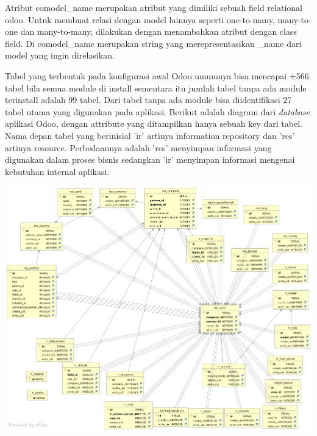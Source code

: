 Atribut comodel{\_}name merupakan atribut yang dimiliki sebuah field relational odoo. Untuk membuat relasi dengan model lainnya seperti one-to-many, many-to-one dan many-to-many, dilakukan dengan menambahkan atribut dengan class field. Di comodel{\_}name merupakan string yang merepresentasikan {\_}name dari model yang ingin direlasikan. 

Tabel yang terbentuk pada konfigurasi awal Odoo umumnya bisa mencapai ±566 tabel bila semua module di install sementara itu jumlah tabel tanpa ada module terinstall adalah 99 tabel. Dari tabel tanpa ada module bisa diidentifikasi 27 tabel utama yang digunakan pada aplikasi. Berikut adalah diagram dari \textit{database} aplikasi Odoo, dengan attribute yang ditampilkan hanya sebuah key dari tabel. Nama depan tabel yang berinisial 'ir' artinya information repository dan 'res' artinya resource. Perbedaannya adalah 'res' menyimpan informasi yang digunakan dalam proses bisnis sedangkan 'ir' menyimpan informasi mengenai kebutuhan internal aplikasi.\\
 
\begin{center}
	\includegraphics[width=14cm]{img/OdooCoreERD.png}
	\label{fig:asd}
\end{center}



